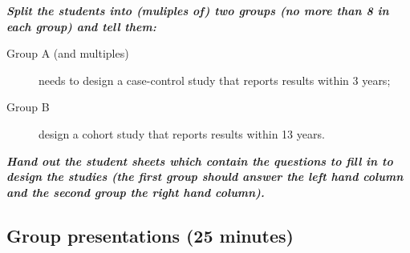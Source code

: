 \documentclass[a4paper,11pt]{scrartcl}
\theoremstyle{plain}
\theoremstyle{remark}
\theoremstyle{definition}
\begin{document}
\textit{\textbf{Split the students into (muliples of) two groups (no more than 8 in each group) and tell them:}}

\medskip


\medskip


\begin{description}
\item[Group A (and multiples)] needs to design a case-control study that reports results within 3 years;
\item[Group B] design a cohort study that reports results within 13 years.
\end{description}


\textit{\textbf{Hand out the student sheets which contain the questions to fill in to design the studies (the first group should answer the left hand column and the second group the right hand column).}}



\subsection{Group presentations (25 minutes)}


\end{document}
